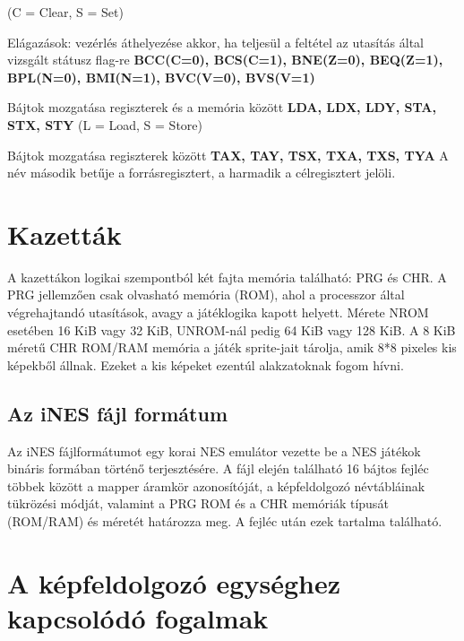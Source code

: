 \begin{compactdesc}
	\newline
	(C = Clear, S = Set)
	\item Elágazások: vezérlés áthelyezése akkor, ha teljesül a feltétel az utasítás által vizsgált státusz flag-re
	\newline \textbf{BCC(C=0), BCS(C=1), BNE(Z=0), BEQ(Z=1), BPL(N=0), BMI(N=1),  BVC(V=0), BVS(V=1)}
	\item Bájtok mozgatása regiszterek és a memória között
	\newline
	\textbf{LDA, LDX, LDY, STA, STX, STY} 
	\newline
	(L = Load, S = Store)
	\item Bájtok mozgatása regiszterek között
	\newline
	\textbf{TAX, TAY, TSX, TXA, TXS, TYA}
	\newline
	A név második betűje a forrásregisztert, a harmadik a célregisztert jelöli.
\end{compactdesc}

\section{Kazetták}

A kazettákon logikai szempontból két fajta memória található: PRG és CHR.
A PRG jellemzően csak olvasható memória (ROM), ahol a processzor által végrehajtandó utasítások, avagy a játéklogika kapott helyett. Mérete NROM esetében 16 KiB vagy 32 KiB, UNROM-nál pedig 64 KiB vagy 128 KiB. A 8 KiB méretű CHR ROM/RAM memória a játék sprite-jait tárolja, amik 8*8 pixeles kis képekből állnak. Ezeket a kis képeket ezentúl alakzatoknak fogom hívni. 

\subsection{Az iNES fájl formátum}

Az iNES fájlformátumot egy korai NES emulátor vezette be a NES játékok bináris formában történő terjesztésére. A fájl elején található 16 bájtos fejléc többek között a mapper áramkör azonosítóját, a képfeldolgozó névtábláinak tükrözési módját, valamint a PRG ROM és a CHR memóriák típusát (ROM/RAM) és méretét határozza meg. A fejléc után ezek tartalma található.

\section{A képfeldolgozó egységhez kapcsolódó fogalmak}


